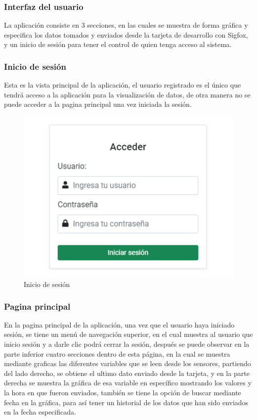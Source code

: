 \documentclass[12pt]{book}
\begin{document}
\vspace{8cm}

\subsubsection{Interfaz del usuario}
La aplicación consiste en 3 secciones, en las cuales se muestra de forma gráfica y especifica los datos tomados y enviados desde la tarjeta de desarrollo con Sigfox, y un inicio de sesión para tener el control de quien tenga acceso al sistema.

\subsubsection{Inicio de sesión}
Esta es la vista principal de la aplicación, el usuario registrado es el único que tendrá acceso a la aplicación para la visualización de datos, de otra manera no se puede acceder a la pagina principal una vez iniciada la sesión.

\begin{figure}[h!]
	\centering
	\includegraphics[width=0.5\linewidth]{imagenes/login}
	\caption{Inicio de sesión}
	\label{fig:Inicio de sesión}
\end{figure}

\vspace{3cm}



\subsubsection{Pagina principal}
En la pagina principal de la aplicación, una vez que el usuario haya iniciado sesión, se tiene un menú de navegación superior, en el cual muestra al usuario que inicio sesión y a darle clic podrá cerrar la sesión, después se puede observar en la parte inferior cuatro secciones dentro de esta página, en la cual se muestra mediante graficas las diferentes variables que se leen desde los sensores, partiendo del lado derecho, se obtiene el ultimo dato enviado desde la tarjeta, y en la parte derecha se muestra la gráfica de esa variable en específico mostrando los valores y la hora en que fueron enviados, también se tiene la opción de buscar mediante fecha en la gráfica, para así tener un historial de los datos que han sido enviados en la fecha especificada.
\end{document}
